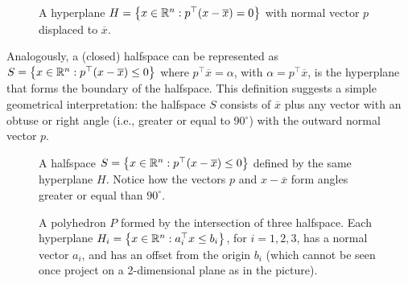 	\begin{figure}[H]
		\caption{A hyperplane $H = \left\{ x \in \mathbb{R}^n: p^\top(x - \overline{x}) = 0 \right \}$ with normal vector $p$ displaced to $\overline{x}$.}
	\end{figure}
	
	Analogously, a (closed) halfspace can be represented as $S = \left\{ x \in \mathbb{R}^n : p^\top(x - \overline{x}) \le 0 \right \}$ where $p^\top \overline{x} = \alpha$, with $\alpha = p^\top \overline{x}$, is the hyperplane that forms the boundary of the halfspace. This definition suggests a simple geometrical interpretation: the halfspace $S$ consists of $\overline{x}$ plus any vector with an obtuse or right angle (i.e., greater or equal to 90$^\circ$) with the outward normal vector $p$.
 
 	\begin{figure}[H]
		\caption{A halfspace $S = \left\{ x \in \mathbb{R}^n : p^\top(x - \overline{x}) \le 0 \right \}$ defined by the same hyperplane $H$. Notice how the vectors $p$ and $x - \overline{x}$ form angles greater or equal than $90^\circ$.}
	\end{figure}
	
	\begin{figure}[H]
    \caption{A polyhedron $P$ formed by the intersection of three halfspace. Each hyperplane $H_i = \left\{ x \in \mathbb{R}^n : a_i^\top x \leq b_i \right \}$, for $i = 1,2,3$, has a normal vector $a_i$, and has an offset from the origin $b_i$ (which cannot be seen once project on a 2-dimensional plane as in the picture).} \label{fig:polyhedral_set}
\end{figure}

